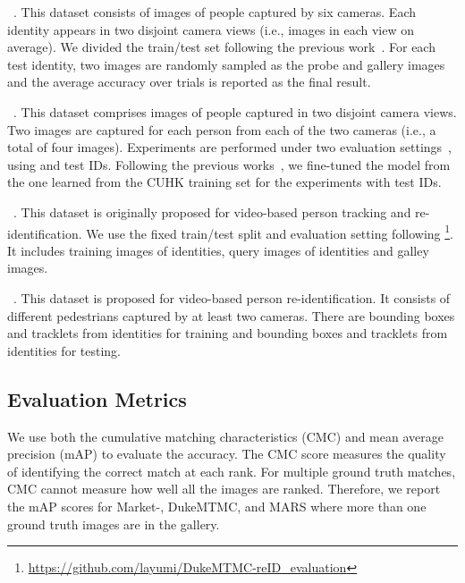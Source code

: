 \documentclass{llncs}
\begin{document}
\vspace{0.1cm}
~\cite{deepreid2014}. This dataset consists of
 images of  people
captured by six cameras.
Each identity appears in two disjoint camera views (i.e.,  images in each view on average).
We divided the train/test set following the previous work~\cite{deepreid2014}.
For each test identity, two images are randomly sampled as the probe and gallery images and the average accuracy over  trials is reported as the final result.

\vspace{0.1cm}
~\cite{conf/accv/li12}. This dataset comprises  images of
 people captured in two disjoint camera views.
Two images are captured for each person from each of the two cameras (i.e., a total of four images).
Experiments are performed under two evaluation settings~\cite{improved2015}, using  and  test IDs.
Following the previous works~\cite{improved2015,chen2016deep,ChengGZWZ16,ZhaoLZW17},
we fine-tuned the model from the one learned from the CUHK training set for the experiments with  test IDs.



\vspace{0.1cm}
~\cite{DukeMTMC}. This dataset is originally proposed for video-based person tracking and re-identification.
We use the fixed train/test split and evaluation setting following \cite{journal/arxiv/lin17}\footnote{\url{https://github.com/layumi/DukeMTMC-reID_evaluation}}.
It includes  training images of  identities,
 query images of  identities and  galley images.

\vspace{0.1cm}
~\cite{ZhengBSWSWT16}. This dataset is proposed for video-based person re-identification.
It consists of  different pedestrians captured by at least two cameras.
There are  bounding boxes and  tracklets from  identities for training
and  bounding boxes and  tracklets from  identities for testing.

\subsection{Evaluation Metrics}
We use both the cumulative matching characteristics (CMC) and mean average precision
(mAP) to evaluate the accuracy.
The CMC score measures the quality of identifying the correct match at each rank.
For multiple ground truth matches, CMC cannot measure how well all the images are ranked.
Therefore, we report the mAP scores for Market-, DukeMTMC, and MARS
where more than one ground truth images are in the gallery.
\end{document}
